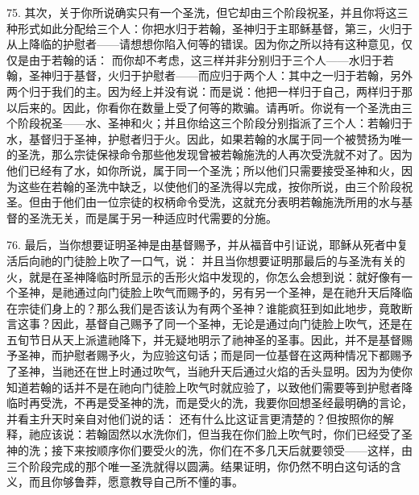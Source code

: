 75. 其次，关于你所说确实只有一个圣洗，但它却由三个阶段祝圣，并且你将这三种形式如此分配给三个人：你把水归于若翰，圣神归于主耶稣基督，第三，火归于从上降临的护慰者——请想想你陷入何等的错误。因为你之所以持有这种意见，仅仅是由于若翰的话： 而你却不考虑，这三样并非分别归于三个人——水归于若翰，圣神归于基督，火归于护慰者——而应归于两个人：其中之一归于若翰，另外两个归于我们的主。因为经上并没有说：而是说：他把一样归于自己，两样归于那以后来的。因此，你看你在数量上受了何等的欺骗。请再听。你说有一个圣洗由三个阶段祝圣——水、圣神和火；并且你给这三个阶段分别指派了三个人：若翰归于水，基督归于圣神，护慰者归于火。因此，如果若翰的水属于同一个被赞扬为唯一的圣洗，那么宗徒保禄命令那些他发现曾被若翰施洗的人再次受洗就不对了。因为他们已经有了水，如你所说，属于同一个圣洗；所以他们只需要接受圣神和火，因为这些在若翰的圣洗中缺乏，以使他们的圣洗得以完成，按你所说，由三个阶段祝圣。但由于他们由一位宗徒的权柄命令受洗，这就充分表明若翰施洗所用的水与基督的圣洗无关，而是属于另一种适应时代需要的分施。\par

76. 最后，当你想要证明圣神是由基督赐予，并从福音中引证说，耶稣从死者中复活后向祂的门徒脸上吹了一口气，说： 并且当你想要证明那最后的与圣洗有关的火，就是在圣神降临时所显示的舌形火焰中发现的，你怎么会想到说：就好像有一个圣神，是祂通过向门徒脸上吹气而赐予的，另有另一个圣神，是在祂升天后降临在宗徒们身上的？那么我们是否该认为有两个圣神？谁能疯狂到如此地步，竟敢断言这事？因此，基督自己赐予了同一个圣神，无论是通过向门徒脸上吹气，还是在五旬节日从天上派遣祂降下，并无疑地明示了祂神圣的圣事。因此，并不是基督赐予圣神，而护慰者赐予火，为应验这句话；而是同一位基督在这两种情况下都赐予了圣神，当祂还在世上时通过吹气，当祂升天后通过火焰的舌头显明。因为为使你知道若翰的话并不是在祂向门徒脸上吹气时就应验了，以致他们需要等到护慰者降临时再受洗，不再是受圣神的洗，而是受火的洗，我要你回想圣经最明确的言论，并看主升天时亲自对他们说的话： 还有什么比这证言更清楚的？但按照你的解释，祂应该说：若翰固然以水洗你们，但当我在你们脸上吹气时，你们已经受了圣神的洗；接下来按顺序你们要受火的洗，你们在不多几天后就要领受——这样，由三个阶段完成的那个唯一圣洗就得以圆满。结果证明，你仍然不明白这句话的含义，而且你够鲁莽，愿意教导自己所不懂的事。\par

